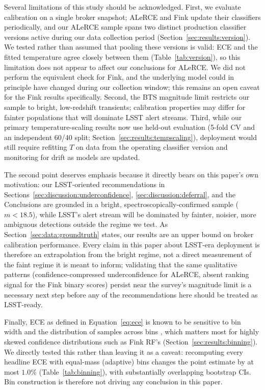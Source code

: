 Several limitations of this study should be acknowledged.
First, we evaluate calibration on a single broker snapshot;
ALeRCE and Fink update their classifiers periodically, and our
ALeRCE sample spans two distinct production classifier versions
active during our data collection period
(Section~\ref{sec:results:version}). We tested rather than assumed
that pooling these versions is valid: ECE and the fitted temperature
agree closely between them (Table~\ref{tab:version}), so this
limitation does not appear to affect our conclusions for ALeRCE.
We did not perform the equivalent check for Fink, and the underlying
model could in principle have changed during our collection window;
this remains an open caveat for the Fink results specifically.
Second, the BTS magnitude limit
restricts our sample to bright, low-redshift transients;
calibration properties may differ for fainter populations
that will dominate LSST alert streams. Third, while our primary
temperature-scaling results now use held-out evaluation (5-fold CV
and an independent 60/40 split;
Section~\ref{sec:results:tempscaling}), deployment would still
require refitting $T$ on data from the operating classifier version
and monitoring for drift as models are updated.

The second point deserves emphasis because it directly bears on
this paper's own motivation: our LSST-oriented recommendations
in Sections~\ref{sec:discussion:underconfidence},
\ref{sec:discussion:deferral}, and the Conclusions are grounded in
a bright, spectroscopically-confirmed sample ($m < 18.5$), while
LSST's alert stream will be dominated by fainter, noisier, more
ambiguous detections outside the regime we test. As
Section~\ref{sec:data:groundtruth} states, our results are an
upper bound on broker calibration performance. Every claim in this
paper about LSST-era deployment is therefore an extrapolation
from the bright regime, not a direct measurement of the faint
regime it is meant to inform; validating that the same qualitative
patterns (confidence-compressed underconfidence for ALeRCE, absent
ranking signal for the Fink binary scores) persist near the survey's
magnitude limit is a necessary next step before any of the
recommendations here should be treated as LSST-ready.

Finally, ECE as defined in Equation~\ref{eq:ece} is known to be
sensitive to bin width and the distribution of samples across bins
\citep{Nixon2019}, which matters most for highly skewed confidence
distributions such as Fink RF's (Section~\ref{sec:results:binning}).
We directly tested this rather than leaving it as a caveat: recomputing
every headline ECE with equal-mass (adaptive) bins \citep{Roelofs2022}
changes the point estimate by at most $1.0\%$ (Table~\ref{tab:binning}),
with substantially overlapping bootstrap CIs. Bin construction is
therefore not driving any conclusion in this paper.